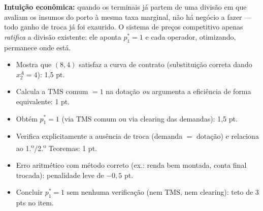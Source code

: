 \begin{solucao}
\textbf{Intuição econômica:} quando os terminais já partem de uma divisão em que avaliam os insumos do porto à mesma taxa marginal, não há negócio a fazer --- todo ganho de troca já foi exaurido. O sistema de preços competitivo apenas \emph{ratifica} a divisão existente: ele aponta $p_1^{*}=1$ e cada operador, otimizando, permanece onde está.
\rubricalabel
\begin{itemize}
\item Mostra que $(8,4)$ satisfaz a curva de contrato (substituição correta dando $x_2^A=4$): 1{,}5 pt.
\item Calcula a $\text{TMS}$ comum $=1$ na dotação \emph{ou} argumenta a eficiência de forma equivalente: 1 pt.
\item Obtém $p_1^{*} = 1$ (via $\text{TMS}$ comum ou via clearing das demandas): 1{,}5 pt.
\item Verifica explicitamente a ausência de troca (demanda $=$ dotação) e relaciona ao 1.\textsuperscript{o}/2.\textsuperscript{o} Teoremas: 1 pt.
\item Erro aritmético com método correto (ex.: renda bem montada, conta final trocada): penalidade leve de $-0{,}5$ pt.
\item Concluir $p_1^{*}=1$ sem nenhuma verificação (nem $\text{TMS}$, nem clearing): teto de 3 pts no item.
\end{itemize}
\end{solucao}

